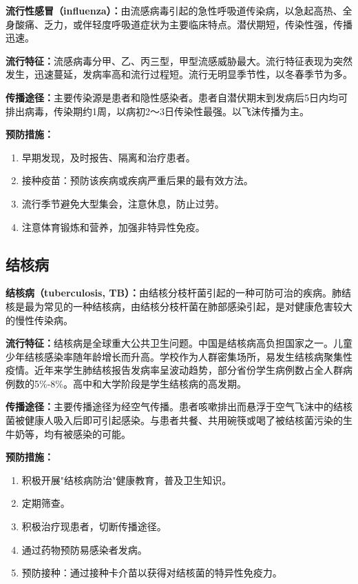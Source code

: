 \begin{keybox}
\textbf{流行性感冒（influenza）：}由流感病毒引起的急性呼吸道传染病，以急起高热、全身酸痛、乏力，或伴轻度呼吸道症状为主要临床特点。潜伏期短，传染性强，传播迅速。

\textbf{流行特征：}流感病毒分甲、乙、丙三型，甲型流感威胁最大。流行特征表现为突然发生，迅速蔓延，发病率高和流行过程短。流行无明显季节性，以冬春季节为多。

\textbf{传播途径：}主要传染源是患者和隐性感染者。患者自潜伏期末到发病后5日内均可排出病毒，传染期约1周，以病初2～3日传染性最强。以飞沫传播为主。

\textbf{预防措施：}
\begin{enumerate}[leftmargin=*]
    \item 早期发现，及时报告、隔离和治疗患者。
    \item 接种疫苗：预防该疾病或疾病严重后果的最有效方法。
    \item 流行季节避免大型集会，注意休息，防止过劳。
    \item 注意体育锻炼和营养，加强非特异性免疫。
\end{enumerate}
\end{keybox}

\subsection{结核病}

\begin{keybox}
\textbf{结核病（tuberculosis, TB）：}由结核分枝杆菌引起的一种可防可治的疾病。肺结核是最为常见的一种结核病，由结核分枝杆菌在肺部感染引起，是对健康危害较大的慢性传染病。

\textbf{流行特征：}结核病是全球重大公共卫生问题。中国是结核病高负担国家之一。儿童少年结核感染率随年龄增长而升高。学校作为人群密集场所，易发生结核病聚集性疫情。近年来学生肺结核报告发病率呈波动趋势，部分省份学生病例数占全人群病例数的5\%-8\%。高中和大学阶段是学生结核病的高发期。

\textbf{传播途径：}主要传播途径为经空气传播。患者咳嗽排出而悬浮于空气飞沫中的结核菌被健康人吸入后即可引起感染。与患者共餐、共用碗筷或喝了被结核菌污染的生牛奶等，均有被感染的可能。

\textbf{预防措施：}
\begin{enumerate}[leftmargin=*]
    \item 积极开展"结核病防治"健康教育，普及卫生知识。
    \item 定期筛查。
    \item 积极治疗现患者，切断传播途径。
    \item 通过药物预防易感染者发病。
    \item 预防接种：通过接种卡介苗以获得对结核菌的特异性免疫力。
\end{enumerate}
\end{keybox}

